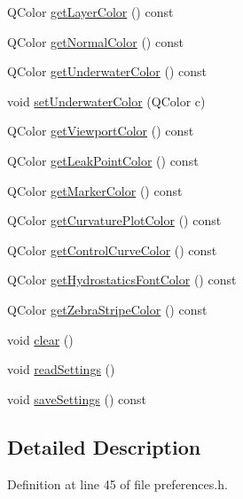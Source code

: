 \begin{DoxyCompactItemize}
\item 
Q\+Color \hyperlink{classShipCAD_1_1Preferences_abdf6967f51626cb6a7cc8596ae521643}{get\+Layer\+Color} () const 
\item 
Q\+Color \hyperlink{classShipCAD_1_1Preferences_a12e9c01bf1f039b9dc03caaf489e0947}{get\+Normal\+Color} () const 
\item 
Q\+Color \hyperlink{classShipCAD_1_1Preferences_a9ab8c8772d6986472eb0e7d1d1f23d32}{get\+Underwater\+Color} () const 
\item 
void \hyperlink{classShipCAD_1_1Preferences_a544aca3f76da5385a9c244583c2fc874}{set\+Underwater\+Color} (Q\+Color c)
\item 
Q\+Color \hyperlink{classShipCAD_1_1Preferences_ab511ccb47da78b8fb580c16aa027b4fa}{get\+Viewport\+Color} () const 
\item 
Q\+Color \hyperlink{classShipCAD_1_1Preferences_a18e8560b2d3bf1a3889fe682220e0421}{get\+Leak\+Point\+Color} () const 
\item 
Q\+Color \hyperlink{classShipCAD_1_1Preferences_a79f08737b96acb62b538feb347e2addf}{get\+Marker\+Color} () const 
\item 
Q\+Color \hyperlink{classShipCAD_1_1Preferences_a8d8d3a62ccea95c7e538006dadd54d7d}{get\+Curvature\+Plot\+Color} () const 
\item 
Q\+Color \hyperlink{classShipCAD_1_1Preferences_a7cbff90dbc01fad7f282287ead8b9a24}{get\+Control\+Curve\+Color} () const 
\item 
Q\+Color \hyperlink{classShipCAD_1_1Preferences_a59c0004d3c77b485a6eece47b42a0d58}{get\+Hydrostatics\+Font\+Color} () const 
\item 
Q\+Color \hyperlink{classShipCAD_1_1Preferences_a7a35fe9a7fbff2b8175424317964d6c5}{get\+Zebra\+Stripe\+Color} () const 
\item 
void \hyperlink{classShipCAD_1_1Preferences_ae2139f76ba4038b4e713ca75dcb8157e}{clear} ()
\item 
void \hyperlink{classShipCAD_1_1Preferences_abc05184c6497085eec42a9c89d639fe0}{read\+Settings} ()
\item 
void \hyperlink{classShipCAD_1_1Preferences_aab29ea10ab3248d163dbc97e2c6b4585}{save\+Settings} () const 
\end{DoxyCompactItemize}


\subsection{Detailed Description}


Definition at line 45 of file preferences.\+h.



